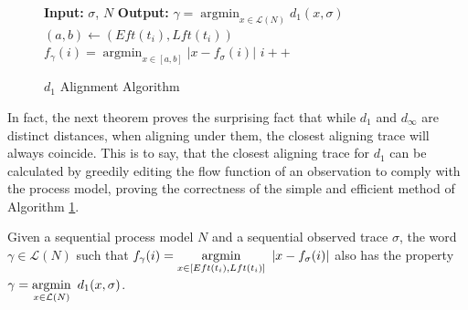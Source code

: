 \documentclass[runningheads]{llncs}
\makeatletter
\newcommand{\removelatexerror}{\let\@latex@error\@gobble}
\DeclareMathOperator*{\argmin}{argmin}
\makeatother
\begin{document}
 \color{firstrevision}
 \begin{figure}[!t]
	\removelatexerror
	\begin{algorithm}[H]
		\caption{$d_1$ Alignment Algorithm}
		\label{MixAlignAlgo}
		\begin{algorithmic}
			\State \textbf{Input: }  $\sigma$, $N$
			\State \textbf{Output: }  $\gamma = \argmin_{x \in \mathcal{L}(N)} d_1(x, \sigma)$
			\State $(a,b) \gets (Eft(t_i), Lft(t_i))$
			\State $f_{\gamma}(i)= \argmin_{x \in [a, b]} {|x - f_\sigma(i)|} $
			\State $i + + $
			\EndFor
		\end{algorithmic}
	\end{algorithm}
\end{figure}


In fact, the next theorem proves the surprising fact that while $d_1$ and $d_\infty$ are distinct distances, when aligning under them, the closest aligning trace will always coincide. 
This is to say, that the closest aligning trace for $d_1$ can be calculated by greedily editing the flow function of an observation to comply with the process model, proving the correctness of the simple and efficient method of Algorithm \ref{MixAlignAlgo}. 

\begin{theorem}\label{MixAlign} Given a sequential process model $N$ and a sequential observed trace $\sigma$, the word $\gamma \in \mathcal{L}(N)$ such that $f_{\gamma}(i)= \underset{x \in [Eft(t_i), Lft(t_i)]} {\argmin}\hspace{0.5em} {|x - f_\sigma(i)|}$ also has the property $\gamma = \underset{x \in \mathcal{L}(N)}{\argmin} \hspace{0.5em}{d_1(x, \sigma)}$. 
\end{theorem}
\color{black}
\end{document}
